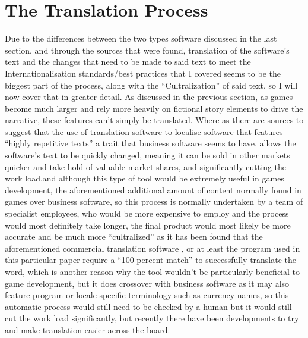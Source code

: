 \documentclass{scrartcl}
\begin{document}
\section{The Translation Process}
Due to the differences between the two types software discussed in the last section, and through the sources that were found, translation of the software's text and the changes that need to be made to said text to meet the Internationalisation standards/best practices that I covered seems to be the biggest part of the process, along with the ``Cultralization'' of said text, so I will now cover that in greater detail. As discussed in the previous section, as games become much larger and rely more heavily on fictional story elements to drive the narrative, these features can't simply be translated. Where as there are sources to suggest that the use of translation software to localise software that features ``highly repetitive texts'' \cite[pg.1]{schaler1994practical} a trait that business software seems to have, allows the software's text to be quickly changed, meaning it can be sold in other markets quicker and take hold of valuable market shares\cite[pg.1]{schaler1994practical}, and significantly cutting the work load,and although this type of tool would be extremely useful in games development, the aforementioned additional amount of content normally found in games over business software, so this process is normally undertaken by a team of specialist employees, who would be more expensive to employ and the process would most definitely take longer, the final product would most likely be more accurate and be much more ``cultralized'' as it has been found that the aforementioned commercial translation software , or at least the program used in this particular paper require a ``100 percent match'' to successfully translate the word, which is another reason why the tool wouldn't be particularly beneficial to game development, but it does crossover with business software as it may also feature program or locale specific terminology such as currency names\cite[pg.2]{schaler1994practical}, so this automatic process would still need to be checked by a human but it would still cut the work load significantly, but recently there have been developments to try and make translation easier across the board.\medskip
\end{document}
